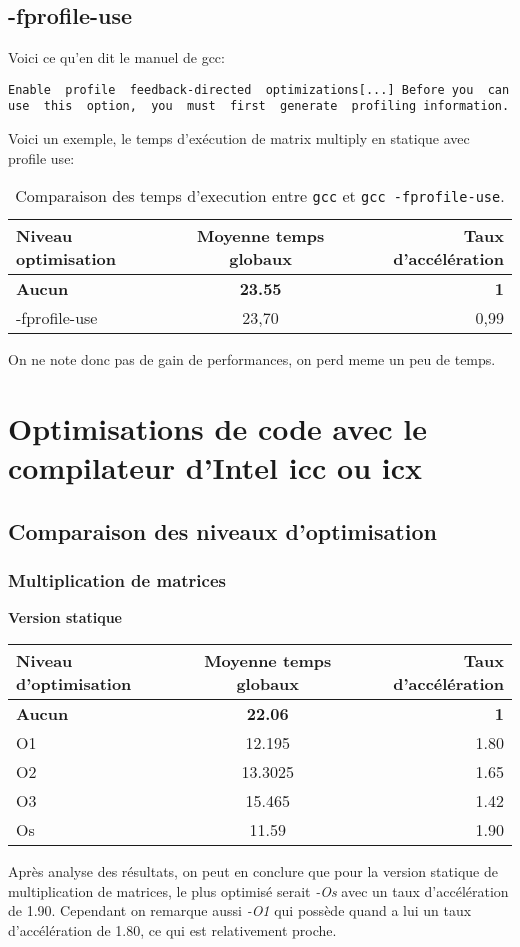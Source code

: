 \documentclass{rapport}
\begin{document}
\subsection{-fprofile-use}
Voici ce qu'en dit le manuel de gcc:
\begin{lstlisting}
Enable  profile  feedback-directed  optimizations[...] Before you  can  use  this  option,  you  must  first  generate  profiling information.
\end{lstlisting}
Voici un exemple, le temps d'exécution de matrix multiply en statique avec profile use:

\begin{table}[H]
\centering
    \begin{tabular}{ l|c|r }
        Niveau optimisation & Moyenne temps globaux & Taux d'accélération \\
        \hline
        \textbf{Aucun} & \textbf{23.55} & \textbf{1} \\ 
        -fprofile-use & 23,70 & 0,99
    \end{tabular}
    \caption{Comparaison des temps d'execution entre \texttt{gcc} et \texttt{gcc -fprofile-use}.}
\end{table}
On ne note donc pas de gain de performances, on perd meme un peu de temps.


\clearpage


\section{Optimisations de code avec le compilateur d’Intel icc ou icx}
\subsection{Comparaison des niveaux d'optimisation}
\subsubsection{Multiplication de matrices}
\textbf{Version statique}
\begin{center}
    \begin{tabular}{ l|c|r }
        Niveau d'optimisation & Moyenne temps globaux & Taux d'accélération \\
        \hline
        \textbf{Aucun} & \textbf{ 22.06 } & \textbf{1} \\
        O1 & 12.195 & 1.80 \\
        O2 & 13.3025 & 1.65 \\
        O3 & 15.465 & 1.42 \\
        Os & 11.59 & 1.90 \\
    \end{tabular}
\end{center}
Après analyse des résultats, on peut en conclure que pour la version statique de multiplication de matrices, le plus optimisé serait \textit{-Os} avec un taux d'accélération de 1.90.
\newline Cependant on remarque aussi \textit{-O1} qui possède quand a lui un taux d'accélération de 1.80, ce qui est relativement proche.
\end{document}
